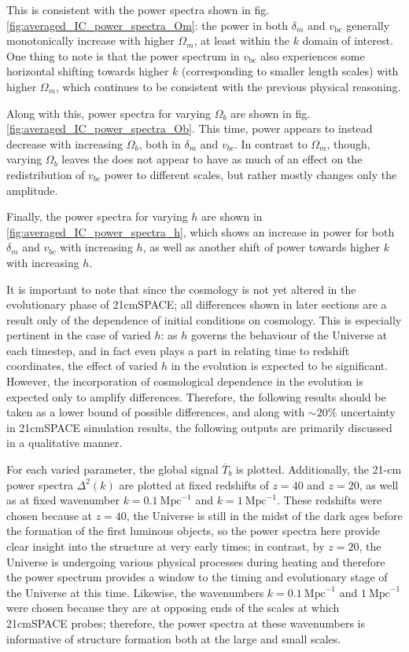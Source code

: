 \documentclass[floats,floatfix,showpacs,amssymb,prd,superscriptaddress,nofootinbib]{revtex4-2} %
\begin{document}
This is consistent with the power spectra shown in fig. \ref{fig:averaged_IC_power_spectra_Om}: the power in both $\delta_m$ and $v_{\text{bc}}$ generally monotonically increase with higher $\Omega_m$, at least within the $k$ domain of interest. One thing to note is that the power spectrum in $v_{\text{bc}}$ also experiences some horizontal shifting towards higher $k$ (corresponding to smaller length scales) with higher $\Omega_m$, which continues to be consistent with the previous physical reasoning.

Along with this, power spectra for varying $\Omega_b$ are shown in fig. \ref{fig:averaged_IC_power_spectra_Ob}. This time, power appears to instead decrease with increasing $\Omega_b$, both in $\delta_m$ and $v_{bc}$. In contrast to $\Omega_m$, though, varying $\Omega_b$ leaves the  does not appear to have as much of an effect on the redistribution of $v_{bc}$ power to different scales, but rather mostly changes only the amplitude.

Finally, the power spectra for varying $h$ are shown in \ref{fig:averaged_IC_power_spectra_h}, which shows an increase in power for both $\delta_m$ and $v_{bc}$ with increasing $h$, as well as another shift of power towards higher $k$ with increasing $h$.

It is important to note that since the cosmology is not yet altered in the evolutionary phase of 21cmSPACE; all differences shown in later sections are a result only of the dependence of initial conditions on cosmology. This is especially pertinent in the case of varied $h$: as $h$ governs the behaviour of the Universe at each timestep, and in fact even plays a part in relating time to redshift coordinates, the effect of varied $h$ in the evolution is expected to be significant. However, the incorporation of cosmological dependence in the evolution is expected only to amplify differences. Therefore, the following results should be taken as a lower bound of possible differences, and along with $\sim 20\%$ uncertainty in 21cmSPACE simulation results, the following outputs are primarily discussed in a qualitative manner.

For each varied parameter, the global signal $\overline{T}_b$ is plotted. Additionally, the 21-cm power spectra $\Delta^2(k)$ are plotted at fixed redshifts of $z = 40$ and $z = 20$, as well as at fixed wavenumber $k = 0.1 ~\text{Mpc}^{-1}$ and $k = 1 ~\text{Mpc}^{-1}$. These redshifts were chosen because at $z = 40$, the Universe is still in the midst of the dark ages before the formation of the first luminous objects, so the power spectra here provide clear insight into the structure at very early times; in contrast, by $z = 20$, the Universe is undergoing various physical processes during heating and therefore the power spectrum provides a window to the timing and evolutionary stage of the Universe at this time. Likewise, the wavenumbers $k = 0.1 ~\text{Mpc}^{-1}$ and $1 ~\text{Mpc}^{-1}$ were chosen because they are at opposing ends of the scales at which 21cmSPACE probes; therefore, the power spectra at these wavenumbers is informative of structure formation both at the large and small scales.
\end{document}
